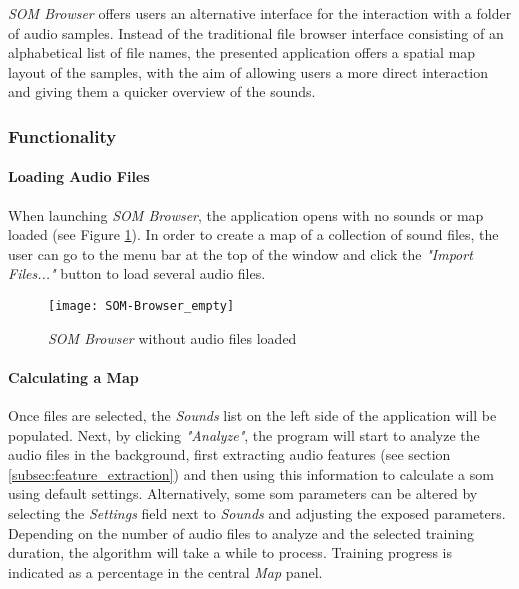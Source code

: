 \textit{SOM Browser} offers users an alternative interface for the interaction
with a folder of audio samples. Instead of the traditional file browser
interface consisting of an alphabetical list of file names, the presented
application offers a spatial map layout of the samples, with the aim of allowing
users a more direct interaction and giving them a quicker overview of the
sounds.

\subsubsection{Functionality}
\label{subsubsec:som-browser_functionality}
\paragraph*{Loading Audio Files}
When launching \textit{SOM Browser}, the application opens with no sounds or map
loaded (see Figure \ref{fig:som-browser_empty}). In order to create a map of
a collection of sound files, the user can go to the menu bar at the top of the
window and click the \textit{"Import Files..."} button to load several audio
files.

\begin{figure}[!htb]
  \centering
  \texttt{[image: SOM-Browser\_empty]}
  \caption{\textit{SOM Browser} without audio files loaded}
  \label{fig:som-browser_empty}
\end{figure}

\paragraph*{Calculating a Map}
Once files are selected, the \textit{Sounds} list on the left side of the
application will be populated. Next, by clicking \textit{"Analyze"}, the program
will start to analyze the audio files in the background, first extracting
audio features (see section \ref{subsec:feature_extraction}) and then using this
information to calculate a \gls{som} using default settings. Alternatively,
some \gls{som} parameters can be altered by selecting the \textit{Settings}
field next to \textit{Sounds} and adjusting the exposed parameters. Depending on
the number of audio files to analyze and the selected training duration, the
algorithm will take a while to process. Training progress is indicated as a
percentage in the central \textit{Map} panel.

\smallskip

